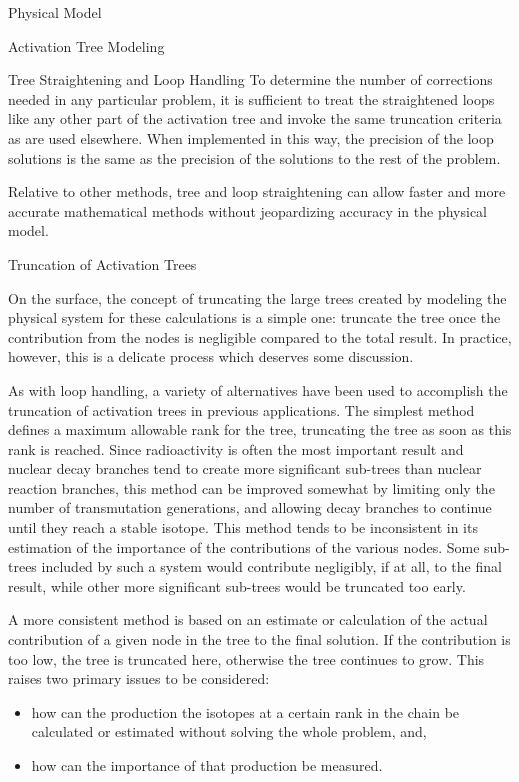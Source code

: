 \begin{chapter}{Physical Model\label{chap:physical}}
\begin{section}{Activation Tree Modeling\label{sec:physical.chains}}
\begin{subsection}{Tree Straightening and Loop Handling\label{sec:physical.chains.loops}}
    To determine the number of corrections needed in any particular
    problem, it is sufficient to treat the straightened loops like any
    other part of the activation tree and invoke the same truncation
    criteria as are used elsewhere.  When implemented in this way, the
    precision of the loop solutions is the same as the precision of
    the solutions to the rest of the problem.
    
    Relative to other methods, tree and loop straightening can allow
    faster and more accurate mathematical methods without jeopardizing
    accuracy in the physical model.
  \end{subsection}

  \begin{subsection}{Truncation of Activation Trees\label{sec:physical.chains.trunc}}
    
    On the surface, the concept of truncating the large trees created
    by modeling the physical system for these calculations is a simple
    one: truncate the tree once the contribution from the nodes is
    negligible compared to the total result.  In practice, however,
    this is a delicate process which deserves some discussion.
    
    As with loop handling, a variety of alternatives have been used to
    accomplish the truncation of activation trees in previous
    applications.  The simplest method defines a maximum allowable
    rank for the tree, truncating the tree as soon as this rank is
    reached.  Since radioactivity is often the most important result
    and nuclear decay branches tend to create more significant
    sub-trees than nuclear reaction branches, this method can be
    improved somewhat by limiting only the number of transmutation
    generations, and allowing decay branches to continue until they
    reach a stable isotope\cite{RACC}.  This method tends to be
    inconsistent in its estimation of the importance of the
    contributions of the various nodes.  Some sub-trees included by
    such a system would contribute negligibly, if at all, to the final
    result, while other more significant sub-trees would be truncated
    too early.
    
    A more consistent method is based on an estimate or calculation of
    the actual contribution of a given node in the tree to the final
    solution.  If the contribution is too low, the tree is truncated
    here, otherwise the tree continues to grow.  This raises two
    primary issues to be considered:
    \begin{itemize}
    \item how can the production the isotopes at a certain rank in the
      chain be calculated or estimated without solving the whole
      problem, and,
    \item how can the importance of that production be measured.
    \end{itemize}
    

\end{subsection}
\end{section}
\end{chapter}
